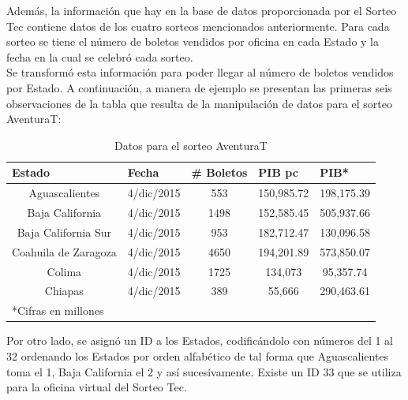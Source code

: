 Además, la información que hay en la base de datos proporcionada por el Sorteo Tec contiene datos de los cuatro sorteos mencionados anteriormente. Para cada sorteo se tiene el número de boletos vendidos por oficina en cada Estado y la fecha en la cual se celebró cada sorteo. \\

Se transformó esta información para poder llegar al número de boletos vendidos por Estado. A continuación, a manera de ejemplo se presentan las primeras seis observaciones de la tabla que resulta de la manipulación de datos para el sorteo AventuraT:

\begin{table}[H]
\caption{Datos para el sorteo AventuraT}
\label{aven}
\begin{tabular}{ccccc}
\hline
\multicolumn{1}{l}{Estado} & \multicolumn{1}{l}{Fecha} & \multicolumn{1}{l}{\# Boletos} & \multicolumn{1}{l}{PIB pc} & \multicolumn{1}{l}{PIB*} \\ \hline
Aguascalientes             & 4/dic/2015                & 553                            & 150,985.72                  & 198,175.39                \\
Baja California            & 4/dic/2015                & 1498                           & 152,585.45                  & 505,937.66                \\
Baja California Sur        & 4/dic/2015                & 953                            & 182,712.47                  & 130,096.58                \\
Coahuila de Zaragoza       & 4/dic/2015                & 4650                           & 194,201.89                  & 573,850.07                \\
Colima                     & 4/dic/2015                & 1725                        & 134,073                     & 95,357.74                 \\
Chiapas                    & 4/dic/2015                & 389                         & 55,666                      & 290,463.61                \\ \hline
\multicolumn{5}{l}{*Cifras en millones}                                                                                                        
\end{tabular}
\centering
{}
\end{table}

Por otro lado, se asignó un ID a los Estados, codificándolo con números del 1 al 32 ordenando los Estados por orden alfabético de tal forma que Aguascalientes toma el 1, Baja California el 2 y así sucesivamente. Existe un ID 33 que se utiliza para la oficina virtual del Sorteo Tec. \\

